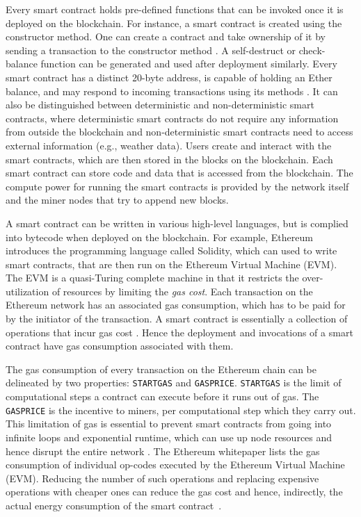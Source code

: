 \documentclass[10pt,conference]{IEEEtran}
\begin{document}
	Every smart contract holds pre-defined functions that can be invoked once it is deployed on the blockchain. For instance, a smart contract is created using the constructor method. One can create a contract and take ownership of it by sending a transaction to the constructor method \cite{wood2019ethereum, khanblockchain}. A self-destruct or check-balance function can be generated and used after deployment similarly. Every smart contract has a distinct 20-byte address, is capable of holding an Ether balance, and may respond to incoming transactions using its methods \cite{alharbyblockchain}. It can also be distinguished between deterministic and non-deterministic smart contracts, where deterministic smart contracts do not require any information from outside the blockchain and non-deterministic smart contracts need to access external information (e.g., weather data)\cite{morabito}. Users create and interact with the smart contracts, which are then stored in the blocks on the blockchain. Each smart contract can store code and data that is accessed from the blockchain. The compute power for running the smart contracts is provided by the network itself and the miner nodes that try to append new blocks.
	
	A smart contract can be written in various high-level languages, but is complied into bytecode when deployed on the blockchain. For example, Ethereum introduces the programming language called Solidity, which can used to write smart contracts, that are then run on the Ethereum Virtual Machine (EVM). The EVM is a quasi-Turing complete machine \cite{wood2019ethereum} in that it restricts the over-utilization of resources by limiting the \textit{gas cost}. Each transaction on the Ethereum network has an associated gas consumption, which has to be paid for by the initiator of the transaction. A smart contract is essentially a collection of operations that incur gas cost \cite{wood2019ethereum}. Hence the deployment and invocations of a smart contract have gas consumption associated with them.
	
	The gas consumption of every transaction on the Ethereum chain can be delineated by two properties: \texttt{STARTGAS} and \texttt{GASPRICE}. \texttt{STARTGAS} is the limit of computational steps a contract can execute before it runs out of gas. The \texttt{GASPRICE} is the incentive to miners, per computational step which they carry out. This limitation of gas is essential to prevent smart contracts from going into infinite loops and exponential runtime, which can use up node resources and hence disrupt the entire network \cite{ethpaper}. The Ethereum whitepaper \cite{ethpaper} lists the gas consumption of individual op-codes executed by the Ethereum Virtual Machine (EVM). Reducing the number of such operations and replacing expensive operations with cheaper ones can reduce the gas cost and hence, indirectly, the actual energy consumption of the smart contract~\cite{contractenergyconsumptionthesis}.
	
\end{document}
